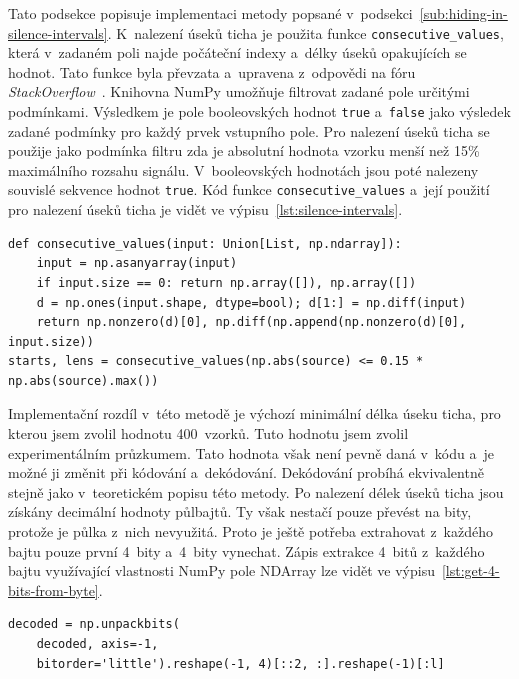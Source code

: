 Tato podsekce popisuje implementaci metody popsané
v~podsekci~\ref{sub:hiding-in-silence-intervals}. K~nalezení úseků ticha je
použita funkce \texttt{consecutive\_values}, která v~zadaném poli najde
počáteční indexy a~délky úseků opakujících se hodnot. Tato funkce byla převzata
a~upravena z~odpovědi na fóru
\textit{StackOverflow}~\cite{ConsecutiveValuesStackOverflow}. Knihovna NumPy
umožňuje filtrovat zadané pole určitými podmínkami. Výsledkem je pole
booleovských hodnot \texttt{true} a~\texttt{false} jako výsledek zadané
podmínky pro každý prvek vstupního pole. Pro nalezení úseků ticha se použije
jako podmínka filtru zda je absolutní hodnota vzorku menší než 15\% maximálního
rozsahu signálu. V~booleovských hodnotách jsou poté nalezeny souvislé sekvence
hodnot \texttt{true}. Kód funkce \texttt{consecutive\_values} a~její použití
pro nalezení úseků ticha je vidět ve výpisu~\ref{lst:silence-intervals}.

\begin{lstlisting}[language=PythonPlus, label={lst:silence-intervals},
caption={Nalezení indexů a~délek úseků ticha.}]
def consecutive_values(input: Union[List, np.ndarray]):
    input = np.asanyarray(input)
    if input.size == 0: return np.array([]), np.array([])
    d = np.ones(input.shape, dtype=bool); d[1:] = np.diff(input)
    return np.nonzero(d)[0], np.diff(np.append(np.nonzero(d)[0], input.size))
starts, lens = consecutive_values(np.abs(source) <= 0.15 * np.abs(source).max())
\end{lstlisting}

Implementační rozdíl v~této metodě je výchozí minimální délka úseku ticha, pro
kterou jsem zvolil hodnotu 400~vzorků. Tuto hodnotu jsem zvolil experimentálním
průzkumem. Tato hodnota však není pevně daná v~kódu a~je možné ji změnit při
kódování a~dekódování. Dekódování probíhá ekvivalentně stejně jako
v~teoretickém popisu této metody. Po nalezení délek úseků ticha jsou získány
decimální hodnoty půlbajtů. Ty však nestačí pouze převést na bity, protože je
půlka z~nich nevyužitá. Proto je ještě potřeba extrahovat z~každého bajtu pouze
první 4~bity a~4~bity vynechat. Zápis extrakce 4~bitů z~každého bajtu
využívající vlastnosti NumPy pole NDArray lze vidět ve
výpisu~\ref{lst:get-4-bits-from-byte}.

\begin{lstlisting}[language=PythonPlus, label={lst:get-4-bits-from-byte},
caption={Extrakce prvních 4~bitů z~každého bajtu.}]
decoded = np.unpackbits(
    decoded, axis=-1,
    bitorder='little').reshape(-1, 4)[::2, :].reshape(-1)[:l]
\end{lstlisting}


